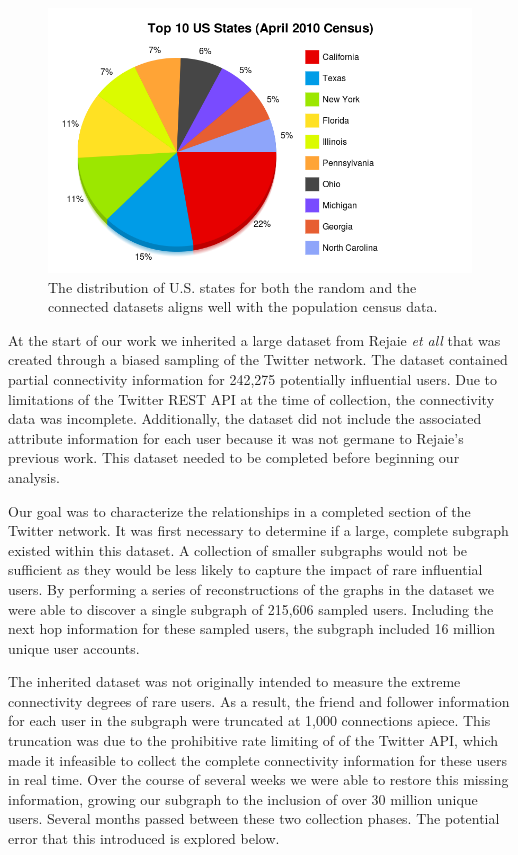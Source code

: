 \begin{figure}[t]
 \includegraphics[bb=0 0 800 500,scale=.2]{./images/loca-actu.png}
\caption{The distribution of U.S. states for both the random and the connected datasets aligns well with the population census data.}
\label{fig:loca-actu}
\end{figure}

At the start of our work we inherited a large dataset from Rejaie \textit{et all} that was created through a biased sampling of the Twitter network.  The dataset contained partial connectivity information for 242,275 potentially influential users.  Due to limitations of the Twitter REST API at the time of collection, the connectivity data was incomplete.  Additionally, the dataset did not include the associated attribute information for each user because it was not germane to Rejaie's previous work.  This dataset needed to be completed before beginning our analysis.

Our goal was to characterize the relationships in a completed section of the Twitter network.  It was first necessary to determine if a large, complete subgraph existed within this dataset.  A collection of smaller subgraphs would not be sufficient as they would be less likely to capture the impact of rare influential users.  By performing a series of reconstructions of the graphs in the dataset we were able to discover a single subgraph of 215,606 sampled users.  Including the next hop information for these sampled users, the subgraph included 16 million unique user accounts.

The inherited dataset was not originally intended to measure the extreme connectivity degrees of rare users.  As a result, the friend and follower information for each user in the subgraph were truncated at 1,000 connections apiece.  This truncation was due to the prohibitive rate limiting of of the Twitter API, which made it infeasible to collect the complete connectivity information for these users in real time.  Over the course of several weeks we were able to restore this missing information, growing our subgraph to the inclusion of over 30 million unique users.  Several months passed between these two collection phases.  The potential error that this introduced is explored below.

